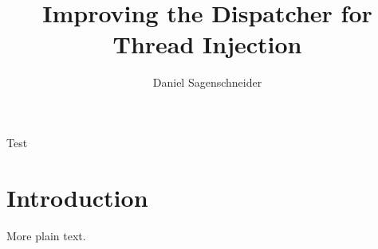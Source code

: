 \documentclass{article}
\begin{document}
\title{Improving the Dispatcher for Thread Injection}
\author{Daniel Sagenschneider}
\date{}
\maketitle

\abstract{}
Test

\section{Introduction}



 \cite{reactor}


More plain text.



\end{document}
